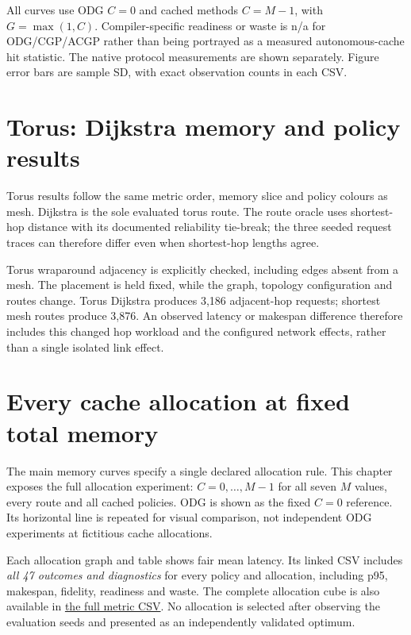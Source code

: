 \documentclass[10pt,a4paper,oneside]{report}
\newcommand{\repo}{https://github.com/sanjeevkrishnaa/Compiler-Driven-ACE}
\newcommand{\datablob}{\repo/blob/codex/ace-scheduler-correctness/docs/latex/qft96_final/data}
\begin{document}
All curves use ODG $C=0$ and cached methods $C=M-1$, with $G=\max(1,C)$. Compiler-specific readiness or waste is n/a for ODG/CGP/ACGP rather than being portrayed as a measured autonomous-cache hit statistic. The native protocol measurements are shown separately. Figure error bars are sample SD, with exact observation counts in each CSV.


\chapter{Torus: Dijkstra memory and policy results}
Torus results follow the same metric order, memory slice and policy colours as mesh. Dijkstra is the sole evaluated torus route. The route oracle uses shortest-hop distance with its documented reliability tie-break; the three seeded request traces can therefore differ even when shortest-hop lengths agree.

Torus wraparound adjacency is explicitly checked, including edges absent from a mesh. The placement is held fixed, while the graph, topology configuration and routes change. Torus Dijkstra produces 3,186 adjacent-hop requests; shortest mesh routes produce 3,876. An observed latency or makespan difference therefore includes this changed hop workload and the configured network effects, rather than a single isolated link effect.


\chapter{Every cache allocation at fixed total memory}
The main memory curves specify a single declared allocation rule. This chapter exposes the full allocation experiment: $C=0,\ldots,M-1$ for all seven $M$ values, every route and all cached policies. ODG is shown as the fixed $C=0$ reference. Its horizontal line is repeated for visual comparison, not independent ODG experiments at fictitious cache allocations.

Each allocation graph and table shows fair mean latency. Its linked CSV includes \emph{all 47 outcomes and diagnostics} for every policy and allocation, including p95, makespan, fidelity, readiness and waste. The complete allocation cube is also available in \href{\datablob/all_allocations_all_metrics.csv}{the full metric CSV}. No allocation is selected after observing the evaluation seeds and presented as an independently validated optimum.

\end{document}

